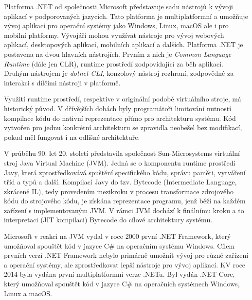 

Platforma .NET od společnosti Microsoft představuje sadu nástrojů k vývoji aplikací v podporovaných jazycích. Tato platforma je multiplatformní a umožňuje vývoj aplikací pro operační systémy jako Windows, Linux, macOS ale i pro mobilní platformy. Vývojáři mohou využívat nástroje pro vývoj webových aplikací, desktopových aplikací, mobilních aplikací a dalších. Platforma .NET je postavena na dvou hlavních nástrojích. Prvním z nich je \textit{Common Language Runtime} (dále jen CLR), runtime prostředí zodpovídající za běh aplikací. Druhým nástrojem je \textit{dotnet CLI}, konzolový nástroj-rozhraní, zodpovědné za interakci s dílčími nástroji v platformě. \cite{Richter2012}


Využití runtime prostředí, respektive v originální podobě virtuálního stroje, má historický původ. V dřívějších dobách byly programátoři limitování nutností kompilace kódu do nativní reprezentace přímo pro architekturu systému. Kód vytvořen pro jednu konkrétní architekturu se zpravidla neobešel bez modifikací, pokud měl fungovat i na odlišné architektuře.

V průběhu 90. let 20. století představila společnost Sun-Microsystems virtuální stroj Java Virtual Machine (JVM). Jedná se o komponentu runtime prostředí Javy, která zprostředkovává spuštění specifického kódu, správu paměti, vytváření tříd a typů a další. Kompilací Javy do tzv. Bytecode (Intermediate Language, zkráceně IL), tedy provedením mezikroku v procesu transformace zdrojového kódu do strojového kódu, je získána reprezentace programu, jenž běží na každém zařízení s implementovaným JVM. V rámci JVM dochází k finálnímu kroku a to interpretaci (JIT kompilaci) Bytecode do cílové architektury systému. 

Microsoft v reakci na JVM vydal v roce 2000 první .NET Framework, který umožňoval spouštět kód v jazyce C\# na operačním systému Windows. Cílem prvních verzí .NET Framework nebylo primárně umožnit vývoj pro různé zařízení a operační systémy, ale zprostředkovat lepší nástroje pro vývoj aplikací. KV roce 2014 byla vydána první multiplatformní verze .NETu. Byl vydán .NET Core, který umožňoval spouštět kód v jazyce C\# na operačních systémech Windows, Linux a macOS. \cite{Richter2012}

